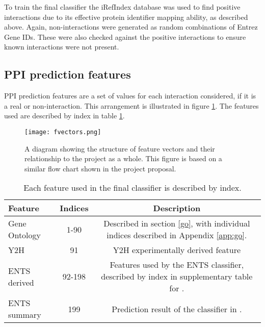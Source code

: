 To train the final classifier the iRefIndex\autocite{razick_irefindex:_2008} database was used to find positive interactions due to its effective protein identifier mapping ability, as described above.
Again, non-interactions were generated as random combinations of Entrez Gene IDs.
These were also checked against the positive interactions to ensure known interactions were not present.

\subsection{PPI prediction features}

PPI prediction features are a set of values for each interaction considered, if it is a real or non-interaction.
This arrangement is illustrated in figure \ref{fig:fvectors}.
The features used are described by index in table \ref{tab:fvectors}.

\begin{figure}
    \centering
    \texttt{[image: fvectors.png]}
    \caption{A diagram showing the structure of feature vectors and their relationship to the project as a whole. This figure is based on a similar flow chart shown in the project proposal.}
    \label{fig:fvectors}
\end{figure}

\begin{table}
    \centering
    \begin{tabular}{l c c}
        Feature         & Indices & Description \\
        \hline
        Gene Ontology   & 1-90    & Described in section \ref{go}, with individual indices described in Appendix \ref{app:go}. \\
        Y2H             & 91      & Y2H experimentally derived feature \\
        ENTS derived    & 92-198  & Features used by the ENTS classifier, described by index in supplementary table for \textcite{rodgers-melnick_predicting_2013}. \\
        ENTS summary    & 199     & Prediction result of the classifier in \textcite{rodgers-melnick_predicting_2013}. \\
    \end{tabular}
    \caption{Each feature used in the final classifier is described by index.}
    \label{tab:fvectors}
\end{table}

